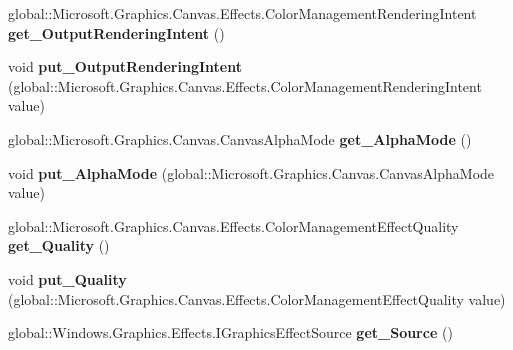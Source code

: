 \begin{DoxyCompactItemize}
global\+::\+Microsoft.\+Graphics.\+Canvas.\+Effects.\+Color\+Management\+Rendering\+Intent {\bfseries get\+\_\+\+Output\+Rendering\+Intent} ()
\item 
\mbox{\label{class_microsoft_1_1_graphics_1_1_canvas_1_1_effects_1_1_color_management_effect_a18c1f342b105332ae8a95cb11dcba930}} 
void {\bfseries put\+\_\+\+Output\+Rendering\+Intent} (global\+::\+Microsoft.\+Graphics.\+Canvas.\+Effects.\+Color\+Management\+Rendering\+Intent value)
\item 
\mbox{\label{class_microsoft_1_1_graphics_1_1_canvas_1_1_effects_1_1_color_management_effect_a8345f14c6facbde7cb0800f962ecaa00}} 
global\+::\+Microsoft.\+Graphics.\+Canvas.\+Canvas\+Alpha\+Mode {\bfseries get\+\_\+\+Alpha\+Mode} ()
\item 
\mbox{\label{class_microsoft_1_1_graphics_1_1_canvas_1_1_effects_1_1_color_management_effect_a09ffed53f704cbca9f184fd3d5872f77}} 
void {\bfseries put\+\_\+\+Alpha\+Mode} (global\+::\+Microsoft.\+Graphics.\+Canvas.\+Canvas\+Alpha\+Mode value)
\item 
\mbox{\label{class_microsoft_1_1_graphics_1_1_canvas_1_1_effects_1_1_color_management_effect_a74e8b9b83a4d172f56e20953dd051a26}} 
global\+::\+Microsoft.\+Graphics.\+Canvas.\+Effects.\+Color\+Management\+Effect\+Quality {\bfseries get\+\_\+\+Quality} ()
\item 
\mbox{\label{class_microsoft_1_1_graphics_1_1_canvas_1_1_effects_1_1_color_management_effect_a4316f7588b101afd626da8698742b520}} 
void {\bfseries put\+\_\+\+Quality} (global\+::\+Microsoft.\+Graphics.\+Canvas.\+Effects.\+Color\+Management\+Effect\+Quality value)
\item 
\mbox{\label{class_microsoft_1_1_graphics_1_1_canvas_1_1_effects_1_1_color_management_effect_a9670ef40f037787138a9f7733b34edc3}} 
global\+::\+Windows.\+Graphics.\+Effects.\+I\+Graphics\+Effect\+Source {\bfseries get\+\_\+\+Source} ()

\end{DoxyCompactItemize}
